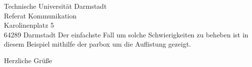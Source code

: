 \documentclass[
	ngerman,
	accentcolor=9c,%
	premium=true,%
]{tudaletter}
\begin{document}
\begin{letter}{%
    Technische Universität Darmstadt\\%
    Referat Kommunikation\\%
    Karolinenplatz 5\\%
    64289 Darmstadt}
Der einfachste Fall um solche Schwierigkeiten zu beheben ist in diesem Beispiel mithilfe der parbox um die Auflistung gezeigt.

\closing{Herzliche Grüße}

	
\end{letter}
\end{document}
